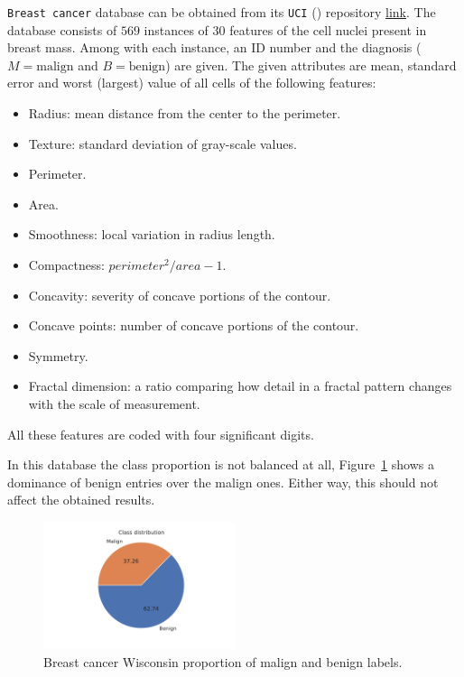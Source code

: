 \texttt{Breast cancer} database can be obtained from its \texttt{UCI} (\cite{DUA:2019}) repository \href{https://archive.ics.uci.edu/ml/datasets/Breast+Cancer+Wisconsin+(Diagnostic)}{link}. The database consists of \(569\) instances of \(30\) features of the cell nuclei present in breast mass. Among with each instance, an ID number and the diagnosis (\( M = \text{malign}\) and \(B = \text{benign}\)) are given. The given attributes are mean, standard error and worst (largest) value of all cells of the following features:
\begin{itemize}
  \item Radius: mean distance from the center to the perimeter.
  \item Texture: standard deviation of gray-scale values.
  \item Perimeter.
  \item Area.
  \item Smoothness: local variation in radius length.
  \item Compactness: \(perimeter^{2} / area - 1\).
  \item Concavity: severity of concave portions of the contour.
  \item Concave points: number of concave portions of the contour.
  \item Symmetry.
  \item Fractal dimension: a ratio comparing how detail in a fractal pattern changes with the scale of measurement.
\end{itemize}
All these features are coded with four significant digits.

In this database the class proportion is not balanced at all, Figure~\ref{fig:breast_proportion} shows a dominance of benign entries over the malign ones. Either way, this should not affect the obtained results.

\begin{figure}
  \centering
  \includegraphics[width = 0.5\textwidth]{tex/images/breast_proportion.pdf}
  \caption{Breast cancer Wisconsin proportion of malign and benign labels.}\label{fig:breast_proportion}
\end{figure}
